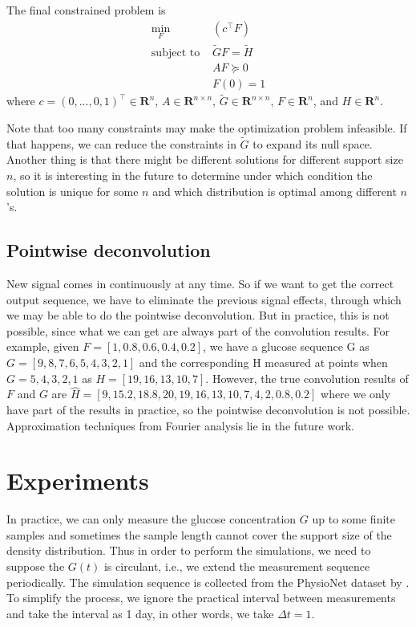 \documentclass{article}
\newcommand\R{\mathbf{R}}
\newcommand\T{^\top}
\newcommand{\st}{\text{subject to }}
\begin{document}
The final constrained problem is
\begin{align*}
\min_{F}\ &(c\T F) \\
\st & \tilde{G}F = \tilde{H} \\
& AF \succeq 0\\
& F(0) = 1
\end{align*}
where $c = (0,...,0,1)\T\in\R^n$, $A\in\R^{n\times n}$, $\tilde{G}\in\R^{n\times n}$, $F\in\R^n$, and $H\in\R^n$.

Note that too many constraints may make the optimization problem infeasible. If that happens, we can reduce the constraints in $\tilde{G}$ to expand its null space. Another thing is that there might be different solutions for different support size $n$, so it is interesting in the future to determine under which condition the solution is unique for some $n$ and which distribution is optimal among different $n$'s.

\subsection{Pointwise deconvolution}
New signal comes in continuously at any time. So if we want to get the correct output sequence, we have to eliminate the previous signal effects, through which we may be able to do the pointwise deconvolution. But in practice, this is not possible, since what we can get are always part of the convolution results. For example, given $F = [1,0.8,0.6,0.4,0.2]$, we have a glucose sequence G as 
$G = [ 9  , 8 ,  7 ,  6 ,  5 ,  4 ,3 ,2 ,1]$ and the corresponding H measured at points when $G=5,4,3,2,1$ as $H = [19, 16, 13, 10, 7]$. However, the true convolution results of $F$ and $G$ are $\hat{H}=[9,   15.2,   18.8,   20,   19, 16,   13,   10,    7,    4,    2, 0.8,    0.2]$ where we only have part of the results in practice, so the pointwise deconvolution is not possible. Approximation techniques from Fourier analysis lie in the future work.


\section{Experiments}
In practice, we can only measure the glucose concentration $G$ up to some finite samples and sometimes the sample length cannot cover the support size of the density distribution. Thus in order to perform the simulations, we need to suppose the $G(t)$ is circulant, i.e., we extend the measurement sequence periodically. The simulation sequence is collected from the PhysioNet dataset by \citet{goldberger2000physiobank}. To simplify the process, we ignore the practical interval between measurements and take the interval as 1 day, in other words, we take $\Delta t = 1$.
\end{document}

